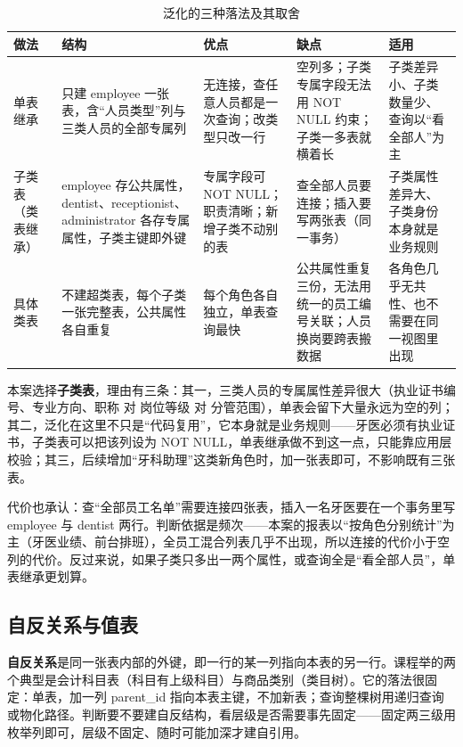 \documentclass[11pt,a4paper]{ctexart}
\begin{document}
\begin{table}[H]
\centering
\caption{泛化的三种落法及其取舍}
{\small
\begin{tabularx}{\linewidth}{@{}L{2.4cm}L{3.6cm}L{3.0cm}L{3.4cm}X@{}}
\toprule
\textbf{\textcolor{adcblue!92}{做法}} & \textbf{\textcolor{adcblue!92}{结构}} & \textbf{\textcolor{adcblue!92}{优点}} & \textbf{\textcolor{adcblue!92}{缺点}} & \textbf{\textcolor{adcblue!92}{适用}} \\
\midrule
单表继承 & 只建 employee 一张表，含“人员类型”列与三类人员的全部专属列 & 无连接，查任意人员都是一次查询；改类型只改一行 & 空列多；子类专属字段无法用 NOT NULL 约束；子类一多表就横着长 & 子类差异小、子类数量少、查询以“看全部人”为主 \\
子类表（类表继承） & employee 存公共属性，dentist、receptionist、administrator 各存专属属性，子类主键即外键 & 专属字段可 NOT NULL；职责清晰；新增子类不动别的表 & 查全部人员要连接；插入要写两张表（同一事务） & 子类属性差异大、子类身份本身就是业务规则 \\
具体类表 & 不建超类表，每个子类一张完整表，公共属性各自重复 & 每个角色各自独立，单表查询最快 & 公共属性重复三份，无法用统一的员工编号关联；人员换岗要跨表搬数据 & 各角色几乎无共性、也不需要在同一视图里出现 \\
\end{tabularx}
}
\end{table}

本案选择\textbf{子类表}，理由有三条：其一，三类人员的专属属性差异很大（执业证书编号、专业方向、职称 对 岗位等级 对 分管范围），单表会留下大量永远为空的列；其二，泛化在这里不只是“代码复用”，它本身就是业务规则——牙医必须有执业证书，子类表可以把该列设为 NOT NULL，单表继承做不到这一点，只能靠应用层校验；其三，后续增加“牙科助理”这类新角色时，加一张表即可，不影响既有三张表。

代价也承认：查“全部员工名单”需要连接四张表，插入一名牙医要在一个事务里写 employee 与 dentist 两行。判断依据是频次——本案的报表以“按角色分别统计”为主（牙医业绩、前台排班），全员工混合列表几乎不出现，所以连接的代价小于空列的代价。反过来说，如果子类只多出一两个属性，或查询全是“看全部人员”，单表继承更划算。

\subsection{自反关系与值表}

\textbf{自反关系}是同一张表内部的外键，即一行的某一列指向本表的另一行。课程举的两个典型是会计科目表（科目有上级科目）与商品类别（类目树）。它的落法很固定：单表，加一列 parent\_id 指向本表主键，不加新表；查询整棵树用递归查询或物化路径。判断要不要建自反结构，看层级是否需要事先固定——固定两三级用枚举列即可，层级不固定、随时可能加深才建自引用。
\end{document}
